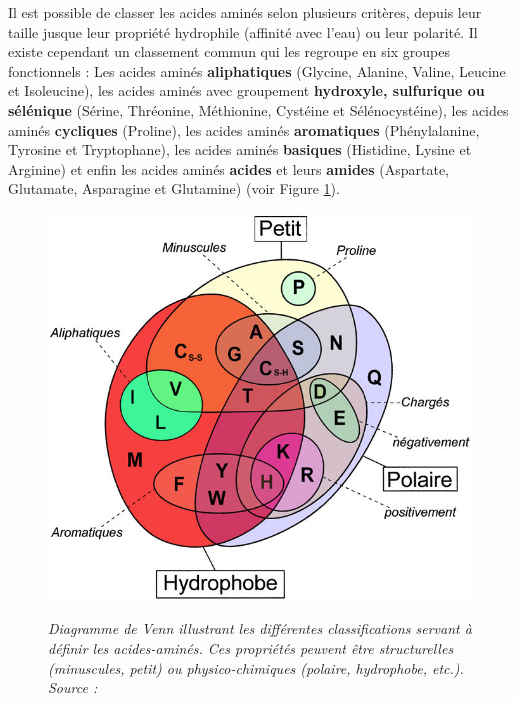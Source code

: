 

Il est possible de classer les acides aminés selon plusieurs critères, depuis leur taille jusque leur propriété hydrophile (affinité avec l'eau) ou leur polarité. Il existe cependant un classement commun qui les regroupe en six groupes fonctionnels : Les acides aminés \textbf{aliphatiques} (Glycine, Alanine, Valine, Leucine et Isoleucine), les acides aminés avec groupement \textbf{hydroxyle, sulfurique ou sélénique} (Sérine, Thréonine, Méthionine, Cystéine et Sélénocystéine), les acides aminés \textbf{cycliques} (Proline), les acides aminés \textbf{aromatiques} (Phénylalanine, Tyrosine et Tryptophane), les acides aminés \textbf{basiques} (Histidine, Lysine et Arginine) et enfin les acides aminés \textbf{acides} et leurs \textbf{amides} (Aspartate, Glutamate, Asparagine et Glutamine) (voir Figure \ref{Fig:diagramme_venn}).

\begin{figure}[!htb]
  \centering
  {\includegraphics[width=0.55\linewidth]{./figures/ch1/diagramme_venn}}
    \caption[Diagramme de Venn illustrant les différentes classifications servant à définir les acides-aminés.]{\it Diagramme de Venn illustrant les différentes classifications servant à définir les acides-aminés. Ces propriétés peuvent être structurelles (minuscules, petit) ou physico-chimiques (polaire, hydrophobe, etc.). 
    Source : \cite{wikipedia_francais_2006}
    }
    \label{Fig:diagramme_venn}
\end{figure}

